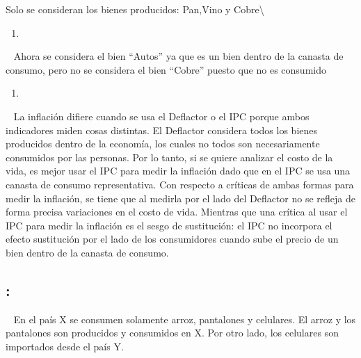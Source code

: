 \documentclass[
  letterpaper,
  DIV=11,
  numbers=noendperiod]{scrreport}
\providecommand{\tightlist}{%
  \setlength{\itemsep}{0pt}\setlength{\parskip}{0pt}}\usepackage{longtable,booktabs,array}
\begin{document}
Solo se consideran los bienes producidos: Pan,Vino y
Cobre\textbackslash{}

\begin{enumerate}
\def\labelenumi{\alph{enumi})}
\setcounter{enumi}{1}
\tightlist
\item
\end{enumerate}

~ Ahora se considera el bien ``Autos'' ya que es un bien dentro de la
canasta de consumo, pero no se considera el bien ``Cobre'' puesto que no
es consumido

\begin{enumerate}
\def\labelenumi{\alph{enumi})}
\setcounter{enumi}{2}
\tightlist
\item
\end{enumerate}

~ La inflación difiere cuando se usa el Deflactor o el IPC porque ambos
indicadores miden cosas distintas. El Deflactor considera todos los
bienes producidos dentro de la economía, los cuales no todos son
necesariamente consumidos por las personas. Por lo tanto, si se quiere
analizar el costo de la vida, es mejor usar el IPC para medir la
inflación dado que en el IPC se usa una canasta de consumo
representativa. Con respecto a críticas de ambas formas para medir la
inflación, se tiene que al medirla por el lado del Deflactor no se
refleja de forma precisa variaciones en el costo de vida. Mientras que
una crítica al usar el IPC para medir la inflación es el sesgo de
sustitución: el IPC no incorpora el efecto sustitución por el lado de
los consumidores cuando sube el precio de un bien dentro de la canasta
de consumo.

\hypertarget{section-27}{%
\subsection{:}\label{section-27}}

~ En el país X se consumen solamente arroz, pantalones y celulares. El
arroz y los pantalones son producidos y consumidos en X. Por otro lado,
los celulares son importados desde el país Y.

\begin{table}[h]
\end{table}
\end{document}
